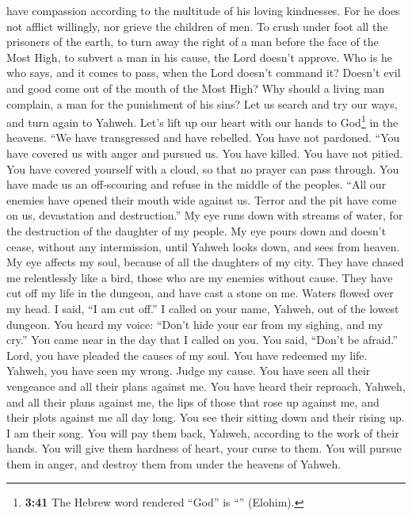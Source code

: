 have compassion according to the multitude of his loving kindnesses.
 For he does not afflict willingly, nor grieve the
children of men.  To crush under foot all the prisoners
of the earth,  to turn away the right of a man before the
face of the Most High,  to subvert a man in his cause,
the Lord doesn't approve.  Who is he who says, and it
comes to pass, when the Lord doesn't command it?  Doesn't
evil and good come out of the mouth of the Most High? 
Why should a living man complain, a man for the punishment of his sins?
 Let us search and try our ways, and turn again to
Yahweh.  Let's lift up our heart with our hands to
God\footnote{\textbf{3:41} The Hebrew word rendered ``God'' is
  ``'' (Elohim).} in the heavens.  ``We
have transgressed and have rebelled. You have not pardoned.
 ``You have covered us with anger and pursued us. You
have killed. You have not pitied.  You have covered
yourself with a cloud, so that no prayer can pass through.
 You have made us an off-scouring and refuse in the
middle of the peoples.  ``All our enemies have opened
their mouth wide against us.  Terror and the pit have
come on us, devastation and destruction.''  My eye runs
down with streams of water, for the destruction of the daughter of my
people.  My eye pours down and doesn't cease, without any
intermission,  until Yahweh looks down, and sees from
heaven.  My eye affects my soul, because of all the
daughters of my city.  They have chased me relentlessly
like a bird, those who are my enemies without cause. 
They have cut off my life in the dungeon, and have cast a stone on me.
 Waters flowed over my head. I said, ``I am cut off.''
 I called on your name, Yahweh, out of the lowest
dungeon.  You heard my voice: ``Don't hide your ear from
my sighing, and my cry.''  You came near in the day that
I called on you. You said, ``Don't be afraid.''  Lord,
you have pleaded the causes of my soul. You have redeemed my life.
 Yahweh, you have seen my wrong. Judge my cause.
 You have seen all their vengeance and all their plans
against me.  You have heard their reproach, Yahweh, and
all their plans against me,  the lips of those that rose
up against me, and their plots against me all day long. 
You see their sitting down and their rising up. I am their song.
 You will pay them back, Yahweh, according to the work of
their hands.  You will give them hardness of heart, your
curse to them.  You will pursue them in anger, and
destroy them from under the heavens of Yahweh.

